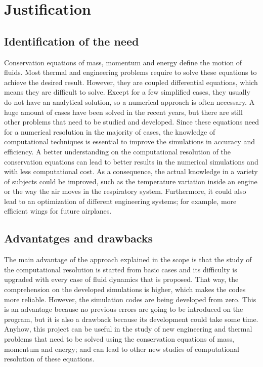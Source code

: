 
\section{Justification}
\subsection{Identification of the need}
Conservation equations of mass, momentum and energy define the motion of fluids. Most thermal and engineering problems require to solve these equations to achieve the desired result. However, they are coupled differential equations, which means they are difficult to solve. Except for a few simplified cases, they usually do not have an analytical solution, so a numerical approach is often necessary. A huge amount of cases have been solved in the recent years, but there are still other problems that need to be studied and developed.
\newline
\newline
Since these equations need for a numerical resolution in the majority of cases, the knowledge of computational techniques is essential to improve the simulations in accuracy and efficiency. A better understanding on the computational resolution of the conservation equations can lead to better results in the numerical simulations and with less computational cost. As a consequence, the actual knowledge in a variety of subjects could be improved, such as the temperature variation inside an engine or the way the air moves in the respiratory system. Furthermore, it could also lead to an optimization of different engineering systems; for example, more efficient wings for future airplanes.

\subsection{Advantatges and drawbacks}
The main advantage of the approach explained in the scope is that the study of the computational resolution is started from basic cases and its difficulty is upgraded with every case of fluid dynamics that is proposed. That way, the comprehension on the developed simulations is higher, which makes the codes more reliable. However, the simulation codes are being developed from zero. This is an advantage because no previous errors are going to be introduced on the program, but it is also a drawback because its development could take some time.
\newline
\newline
Anyhow, this project can be useful in the study of new engineering and thermal problems that need to be solved using the conservation equations of mass, momentum and energy; and can lead to other new studies of computational resolution of these equations.
